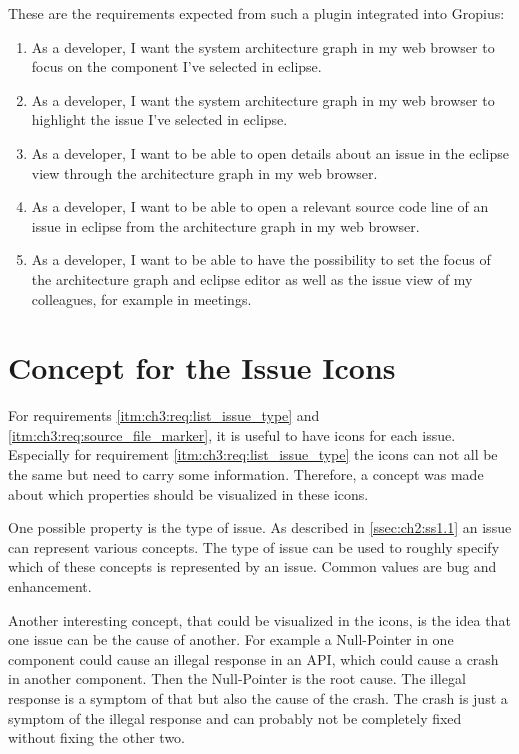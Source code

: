 These are the requirements expected from such a plugin integrated into \gls{Gropius}:
\begin{enumerate}
	\setcounter{enumi}{\value{enumarteCounter}} %
	\item As a developer, I want the system architecture graph in my web browser to focus on the component I've selected in eclipse.
	\item As a developer, I want the system architecture graph in my web browser to highlight the issue I've selected in eclipse.
	\item As a developer, I want to be able to open details about an issue in the eclipse view through the architecture graph in my web browser.
	\item As a developer, I want to be able to open a relevant source code line of an issue in eclipse from the architecture graph in my web browser.
	\item As a developer, I want to be able to have the possibility to set the focus of the architecture graph and eclipse editor as well as the issue view of my colleagues, for example in meetings.
\end{enumerate}

\section{Concept for the Issue Icons}
\label{sec:ch3:s2}
For requirements \ref{itm:ch3:req:list_issue_type} and \ref{itm:ch3:req:source_file_marker}, it is useful to have icons for each issue.
Especially for requirement \ref{itm:ch3:req:list_issue_type} the icons can not all be the same but need to carry some information.
Therefore, a concept was made about which properties should be visualized in these icons.

One possible property is the type of issue.
As described in \cref{ssec:ch2:ss1.1} an issue can represent various concepts.
The type of issue can be used to roughly specify which of these concepts is represented by an issue.
Common values are bug and enhancement.

Another interesting concept, that could be visualized in the icons, is the idea that one issue can be the cause of another.
For example a Null-Pointer in one component could cause an illegal response in an \gls{API}, which could cause a crash in another component.
Then the Null-Pointer is the root cause.
The illegal response is a symptom of that but also the cause of the crash.
The crash is just a symptom of the illegal response and can probably not be completely fixed without fixing the other two.

